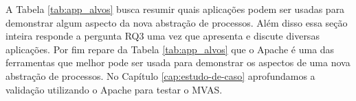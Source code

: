 A Tabela \ref{tab:app_alvos} busca resumir quais aplicações podem ser usadas
para demonstrar algum aspecto da nova abstração de processos. Além disso essa
seção inteira responde a pergunta RQ3 uma vez que apresenta e discute diversas
aplicações. Por fim repare da Tabela \ref{tab:app_alvos} que o Apache é uma das
ferramentas que melhor pode ser usada para demonstrar os aspectos de uma nova
abstração de processos. No Capítulo \ref{cap:estudo-de-caso} aprofundamos a
validação utilizando o Apache para testar o MVAS. 


